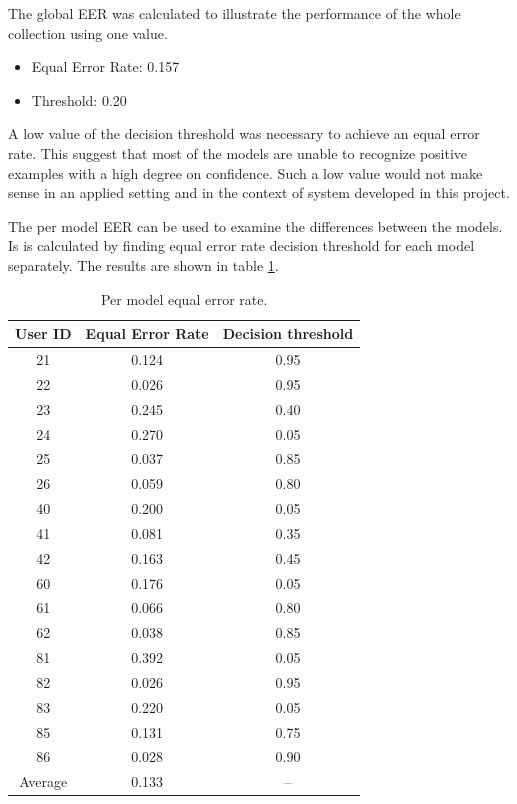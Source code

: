 The global EER was calculated to illustrate the performance of the whole collection using one value.
\begin{itemize}
	\item[] Equal Error Rate: 0.157
	\item[] Threshold: 0.20
\end{itemize}
A low value of the decision threshold was necessary to achieve an equal error rate. This suggest that most of the models are unable to recognize positive examples with a high degree on confidence. Such a low value would not make sense in an applied setting and in the context of system developed in this project. 

The per model EER can be used to examine the differences between the models.\\
Is is calculated by finding equal error rate decision threshold for each model separately.
The results are shown in table \ref{table:EER_separate}.
\begin{center}
	\begin{table}[H]
		\begin{center}
			\begin{tabular}{ |c|c|c| } 
				\hline
				User ID & Equal Error Rate & Decision threshold \\
				\hline
				\hline
				21 & 0.124 & 0.95 \\
				\hline
				22 & 0.026 & 0.95 \\
				\hline
				23 & 0.245 & 0.40 \\
				\hline
				24 & 0.270 & 0.05 \\
				\hline
				25 & 0.037 & 0.85 \\
				\hline
				26 & 0.059 & 0.80 \\
				\hline
				40 & 0.200 & 0.05 \\
				\hline
				41 & 0.081 & 0.35 \\
				\hline
				42 & 0.163 & 0.45 \\
				\hline
				60 & 0.176 & 0.05 \\
				\hline
				61 & 0.066 & 0.80 \\
				\hline
				62 & 0.038 & 0.85 \\
				\hline
				81 & 0.392 & 0.05 \\
				\hline
				82 & 0.026 & 0.95 \\
				\hline
				83 & 0.220 & 0.05 \\
				\hline
				85 & 0.131 & 0.75 \\
				\hline
				86 & 0.028 & 0.90 \\
				\hline
				\hline
				Average & 0.133 & -- \\
				\hline
			\end{tabular}
		\end{center}
		\caption{Per model equal error rate.}
		\label{table:EER_separate}
	\end{table}
\end{center}

